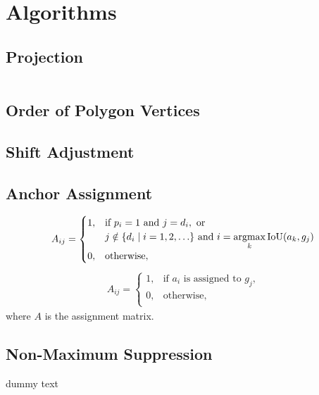 \chapter{Algorithms}
\section{Projection}\label{app:projec}

\begin{lstlisting}
\end{lstlisting}

\section{Order of Polygon Vertices}\label{app:revpoly}

\section{Shift Adjustment}\label{app:shift}

\section{Anchor Assignment}\label{app:assignanchor}
\begin{equation}
\begin{aligned}
	A_{ij} = \begin{cases}
		1, & \text{if } p_i = 1 \text{ and } j = d_i, \text{ or }\\
		& j \notin \{d_i \mid i = 1,2,\ldots\} \text{ and } i = \operatorname*{argmax}\limits_{k} \text{IoU}(a_k, g_j) \\
		0, & \text{otherwise},\\
	\end{cases}
\end{aligned}
\end{equation}
\begin{equation}
\begin{aligned}
	A_{ij} = \begin{cases}
		1, & \text{if $a_i$ is assigned to $g_j$,}\\
		0, & \text{otherwise},\\
	\end{cases}
\end{aligned}
\end{equation}
where $A$ is the assignment matrix. 

\section{Non-Maximum Suppression}\label{app:nms}
dummy text


